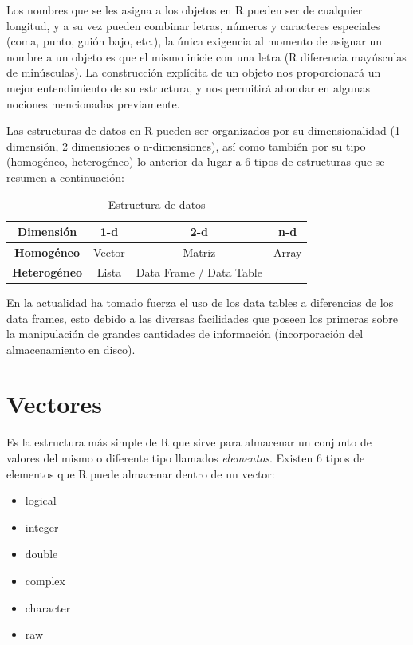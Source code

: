 \documentclass[11pt,a4paper,oneside]{book}\usepackage[]{graphicx}\usepackage[]{color}
\begin{document}
\begin{itemize}
Los nombres que se les asigna a los objetos en R pueden ser de cualquier longitud, y a su vez pueden combinar letras, números y caracteres especiales (coma, punto, guión bajo, etc.), la única exigencia al momento de asignar un nombre a un objeto es que el mismo inicie con una letra (R diferencia mayúsculas de minúsculas). La construcción explícita de un objeto nos proporcionará un mejor entendimiento de su estructura, y nos permitirá ahondar en algunas nociones mencionadas previamente.\newline

Las estructuras de datos en R pueden ser organizados por su dimensionalidad (1 dimensión, 2 dimensiones o n-dimensiones), así como también por su tipo (homogéneo, heterogéneo) lo anterior da lugar a 6 tipos de estructuras que se resumen a continuación:
\begin{table}[H]
\centering
\begin{tabular}{cccc}\hline
{\bf Dimensión} & {\bf 1-d} & {\bf 2-d} & {\bf n-d} \\ \hline
{\bf Homogéneo} & Vector & Matriz & Array \\ \hline
{\bf Heterogéneo} & Lista & Data Frame / Data Table & \\ \hline
\end{tabular}
\caption{Estructura de datos}
\end{table}

En la actualidad ha tomado fuerza el uso de los data tables a diferencias de los data frames, esto debido a las diversas facilidades que poseen los primeras sobre la manipulación de grandes cantidades de información (incorporación del almacenamiento en disco). 

\section{Vectores}
Es la estructura más simple de R que sirve para almacenar un conjunto de valores del mismo o diferente tipo llamados \emph{elementos}. Existen 6 tipos de elementos que R puede almacenar dentro de un vector:
\begin{multicols}{2}
\begin{itemize}
   \item logical
   \item integer
   \item double
   \item complex
   \item character
   \item raw
\end{itemize}
\end{multicols}


\end{itemize}
\end{document}
